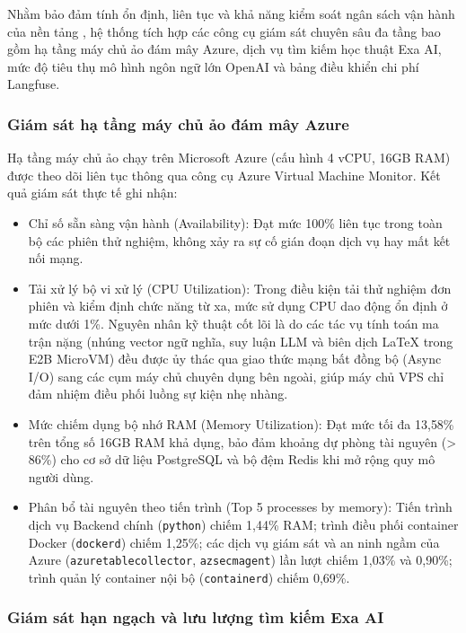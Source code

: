 Nhằm bảo đảm tính ổn định, liên tục và khả năng kiểm soát ngân sách vận hành của nền tảng \VS, hệ thống tích hợp các công cụ giám sát chuyên sâu đa tầng bao gồm hạ tầng máy chủ ảo đám mây Azure, dịch vụ tìm kiếm học thuật Exa AI, mức độ tiêu thụ mô hình ngôn ngữ lớn OpenAI và bảng điều khiển chi phí Langfuse.

\subsubsection{Giám sát hạ tầng máy chủ ảo đám mây Azure}
\label{subsubsec:monitor_azure}

Hạ tầng máy chủ ảo chạy trên Microsoft Azure (cấu hình 4 vCPU, 16GB RAM) được theo dõi liên tục thông qua công cụ Azure Virtual Machine Monitor. Kết quả giám sát thực tế ghi nhận:
\begin{itemize}[noitemsep, topsep=2pt]
    \item Chỉ số sẵn sàng vận hành (Availability): Đạt mức 100\% liên tục trong toàn bộ các phiên thử nghiệm, không xảy ra sự cố gián đoạn dịch vụ hay mất kết nối mạng.
    \item Tải xử lý bộ vi xử lý (CPU Utilization): Trong điều kiện tải thử nghiệm đơn phiên và kiểm định chức năng từ xa, mức sử dụng CPU dao động ổn định ở mức dưới 1\%. Nguyên nhân kỹ thuật cốt lõi là do các tác vụ tính toán ma trận nặng (nhúng vector ngữ nghĩa, suy luận LLM và biên dịch LaTeX trong E2B MicroVM) đều được ủy thác qua giao thức mạng bất đồng bộ (Async I/O) sang các cụm máy chủ chuyên dụng bên ngoài, giúp máy chủ VPS chỉ đảm nhiệm điều phối luồng sự kiện nhẹ nhàng.
    \item Mức chiếm dụng bộ nhớ RAM (Memory Utilization): Đạt mức tối đa 13{,}58\% trên tổng số 16GB RAM khả dụng, bảo đảm khoảng dự phòng tài nguyên (> 86\%) cho cơ sở dữ liệu PostgreSQL và bộ đệm Redis khi mở rộng quy mô người dùng.
    \item Phân bổ tài nguyên theo tiến trình (Top 5 processes by memory): Tiến trình dịch vụ Backend chính (\texttt{python}) chiếm 1{,}44\% RAM; trình điều phối container Docker (\texttt{dockerd}) chiếm 1{,}25\%; các dịch vụ giám sát và an ninh ngầm của Azure (\texttt{azuretablecollector}, \texttt{azsecmagent}) lần lượt chiếm 1{,}03\% và 0{,}90\%; trình quản lý container nội bộ (\texttt{containerd}) chiếm 0{,}69\%.
\end{itemize}

\subsubsection{Giám sát hạn ngạch và lưu lượng tìm kiếm Exa AI}
\label{subsubsec:monitor_exa}

